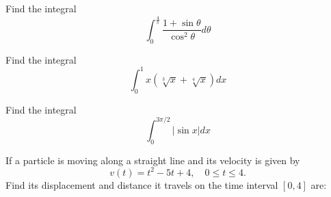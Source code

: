 \documentclass[
  course = {{MATH102 Calculus II}},
  quartile = {{2}},
  assignment = 4 - Wednesday,%
  firstexercise = 1,
  term = 202
]{aga-homework}
\begin{document}
\newpage

\problem Find the integral
\[
\int_{0}^{\frac{4}{\pi}} \frac{1+\sin\theta}{\cos^2\theta}d\theta
\]
\newpage

\problem Find the integral
\[
\int_{0}^{1} x\left(\sqrt[3]{x}+\sqrt[4]{x}\right)dx
\]
\newpage


\problem Find the integral
\[
\int_{0}^{3\pi/2} \left|\sin x\right|dx
\]
\newpage

\problem If a particle is moving along a straight line and its velocity
is given by
\[
v(t) = t^2 - 5t + 4, \quad 0 \leq t \leq 4.
\]
Find its displacement and distance it travels on the time
interval $[0, 4]$ are:
\end{document}
